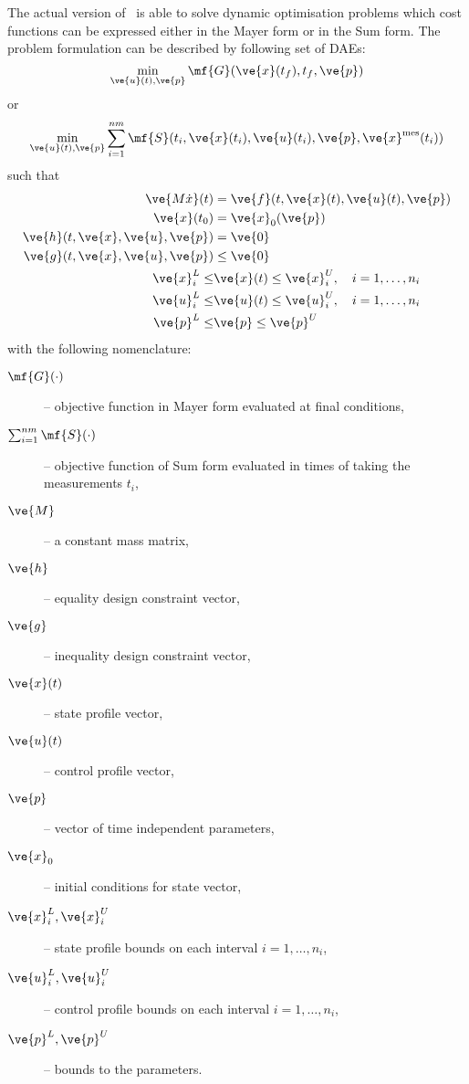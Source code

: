 The actual version of~ is able to solve dynamic
optimisation problems which cost functions can be expressed either in
the Mayer form or in the Sum form. The problem formulation can be
described by following set of DAEs: 
\begin{equation}
\min_{\ve{u}(t),\ve{p}}\mf{G}(\ve{x}(t_{f}),t_{f},\ve{p})
\label{eq:objmajer}  
\end{equation} or
\begin{equation}
\min_{\ve{u}(t),\ve{p}} \sum_{i=1}^{nm} 
\mf{S}(t_{i},\ve{x}(t_{i}),\ve{u}(t_{i}),\ve{p},\ve{x}^{\text{mes}}(t_{i}))
\label{eq:objsum}  
\end{equation} 
such that
\begin{align*}
\ve{M\dot{x}}(t)&=\ve{f}(t,\ve{x}(t),\ve{u}(t),\ve{p})\\ 
\ve{x}(t_{0})&=\ve{x}_{0}(\ve{p})\\ 
\ve{h}(t,\ve{x},\ve{u},\ve{p}) &= \ve{0}\\
\ve{g}(t,\ve{x},\ve{u},\ve{p}) &\leq \ve{0}\\
\ve{x}^{L}_i\leq &\ve{x}(t)\leq \ve{x}^{U}_i, \quad i=1,\ldots, n_i\\ 
\ve{u}^{L}_i\leq &\ve{u}(t)\leq \ve{u}^{U}_i, \quad i=1,\ldots, n_i\\
\ve{p}^{L}\leq &\ve{p}\leq \ve{p}^{U}
\end{align*}
with the following nomenclature:
\begin{description}
\item[$\mf{G}(\cdot)$] -- objective function in Mayer form evaluated
  at final conditions,  
\item[$\sum_{i=1}^{nm} \mf{S}(\cdot)$]  -- objective function of Sum
  form evaluated in times of taking the measurements $t_{i}$, 
\item [$\ve{M}$] -- a constant mass matrix,
\item [$\ve{h}$] -- equality design constraint vector,
\item [$\ve{g}$] -- inequality design constraint vector,
\item [$\ve{x}(t)$] -- state profile vector,
\item [$\ve{u}(t)$] -- control profile vector,
\item [$\ve{p}$] -- vector of time independent parameters,
\item [$\ve{x}_0$] -- initial conditions for state vector,
\item [$\ve{x}^{L}_i,\ve{x}^{U}_i$] -- state profile bounds on
  each interval $i=1,\ldots, n_i$, 
\item [$\ve{u}^{L}_i,\ve{u}^{U}_i$] -- control profile bounds on
  each interval $i=1,\ldots, n_i$, 
\item [$\ve{p}^{L},\ve{p}^{U}$] -- bounds to the parameters.
\end{description} 

